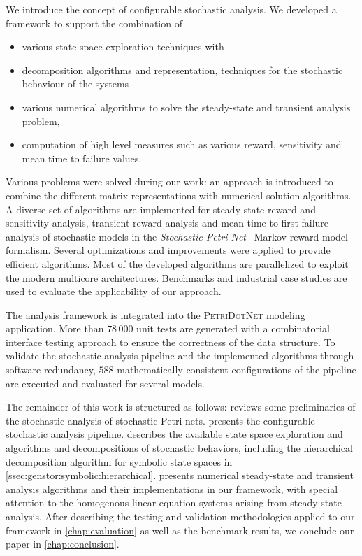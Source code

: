 We introduce the concept of configurable stochastic analysis. We developed a
framework to support the combination of
\begin{itemize}
\item various state space exploration techniques with
\item decomposition algorithms and representation,
  techniques for the stochastic behaviour of the systems 
\item various numerical algorithms to solve the steady-state and
  transient analysis problem,
\item computation of high level measures such as various reward,
  sensitivity and mean time to failure values.
\end{itemize}

Various problems were solved during our work: an approach is
introduced to combine the different matrix representations with
numerical solution algorithms. A diverse set of algorithms are
implemented for steady-state reward and sensitivity analysis,
transient reward analysis and mean-time-to-first-failure analysis of
stochastic models in the \emph{Stochastic Petri
  Net}~ Markov reward model formalism. Several
optimizations and improvements were applied to provide efficient
algorithms. Most of the developed algorithms are parallelized to
exploit the modern multicore architectures. Benchmarks and industrial
case studies are used to evaluate the applicability of our approach.

The analysis framework is integrated into the \textsc{PetriDotNet}
modeling application. More than $78\,000$ unit tests are generated
with a combinatorial interface testing approach to ensure the
correctness of the data structure. To validate the stochastic analysis
pipeline and the implemented algorithms through software redundancy,
$588$ mathematically consistent configurations of the pipeline are
executed and evaluated for several models.

The remainder of this work is structured as follows:
 reviews some preliminaries of the stochastic
analysis of stochastic Petri nets.  presents the
configurable stochastic analysis pipeline. 
describes the available state space exploration and algorithms and
decompositions of stochastic behaviors, including the hierarchical
decomposition algorithm for symbolic state spaces in
\cref{ssec:genstor:symbolic:hierarchical}. 
presents numerical steady-state and transient analysis algorithms and
their implementations in our framework, with special attention to the
homogenous linear equation systems arising from steady-state
analysis. After describing the testing and validation methodologies
applied to our framework in \cref{chap:evaluation} as well as the
benchmark results, we conclude our paper in \cref{chap:conclusion}.

